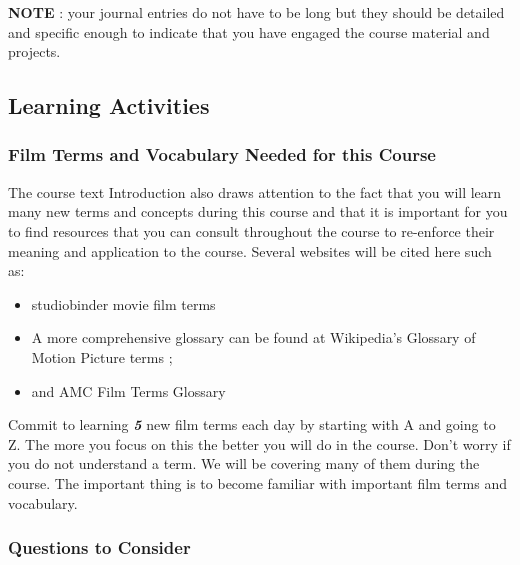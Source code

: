 \documentclass[
]{book}
\providecommand{\tightlist}{%
  \setlength{\itemsep}{0pt}\setlength{\parskip}{0pt}}
\begin{document}
\begin{caution}
\textbf{NOTE} : your journal entries do not have to be long but they should be detailed and specific enough to indicate that you have engaged the course material and projects.
\end{caution}

\hypertarget{learning-activities-1}{%
\subsection*{Learning Activities}\label{learning-activities-1}}

\begin{reflect}
\hypertarget{film-terms-and-vocabulary-needed-for-this-course}{%
\subsubsection*{Film Terms and Vocabulary Needed for this Course}\label{film-terms-and-vocabulary-needed-for-this-course}}

The course text Introduction also draws attention to the fact that you will learn many new terms and concepts during this course and that it is important for you to find resources that you can consult throughout the course to re-enforce their meaning and application to the course. Several websites will be cited here such as:

\begin{itemize}
\tightlist
\item
  studiobinder movie film terms \\
\item
  A more comprehensive glossary can be found at Wikipedia's Glossary of Motion Picture terms ;\\
\item
  and AMC Film Terms Glossary
\end{itemize}

Commit to learning \textbf{\emph{5}} new film terms each day by starting with A and going to Z. The more you focus on this the better you will do in the course. Don't worry if you do not understand a term. We will be covering many of them during the course. The important thing is to become familiar with important film terms and vocabulary.

\hypertarget{questions-to-consider}{%
\subsubsection*{Questions to Consider}\label{questions-to-consider}}


\end{reflect}
\end{document}
